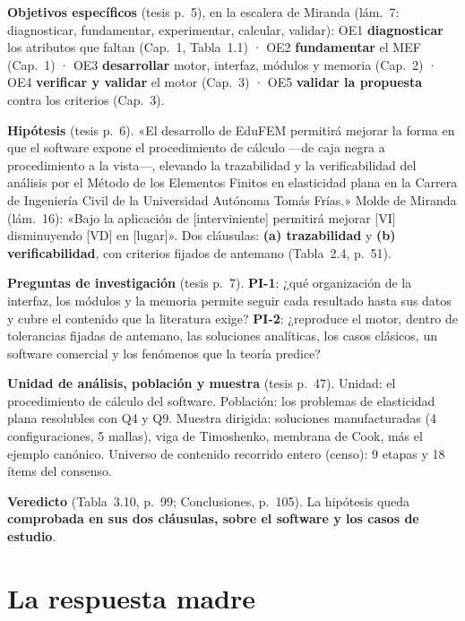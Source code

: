 \documentclass[11pt,a4paper]{article}
\newcommand{\campo}[1]{\textbf{\textcolor{tinta2}{#1}}\enspace}
\begin{document}
\begin{memorizar}
\campo{Objetivos específicos} (tesis p.~5), en la escalera de Miranda (lám.~7: diagnosticar, fundamentar, experimentar, calcular, validar): OE1 \textbf{diagnosticar} los atributos que faltan (Cap.~1, Tabla~1.1) · OE2 \textbf{fundamentar} el MEF (Cap.~1) · OE3 \textbf{desarrollar} motor, interfaz, módulos y memoria (Cap.~2) · OE4 \textbf{verificar y validar} el motor (Cap.~3) · OE5 \textbf{validar la propuesta} contra los criterios (Cap.~3).

\campo{Hipótesis} (tesis p.~6). «El desarrollo de EduFEM permitirá mejorar la forma en que el software expone el procedimiento de cálculo ---de caja negra a procedimiento a la vista---, elevando la trazabilidad y la verificabilidad del análisis por el Método de los Elementos Finitos en elasticidad plana en la Carrera de Ingeniería Civil de la Universidad Autónoma Tomás Frías.» Molde de Miranda (lám.~16): «Bajo la aplicación de [interviniente] permitirá mejorar [VI] disminuyendo [VD] en [lugar]». Dos cláusulas: \textbf{(a) trazabilidad} y \textbf{(b) verificabilidad}, con criterios fijados de antemano (Tabla~2.4, p.~51).

\campo{Preguntas de investigación} (tesis p.~7). \textbf{PI-1}: ¿qué organización de la interfaz, los módulos y la memoria permite seguir cada resultado hasta sus datos y cubre el contenido que la literatura exige? \textbf{PI-2}: ¿reproduce el motor, dentro de tolerancias fijadas de antemano, las soluciones analíticas, los casos clásicos, un software comercial y los fenómenos que la teoría predice?

\campo{Unidad de análisis, población y muestra} (tesis p.~47). Unidad: el procedimiento de cálculo del software. Población: los problemas de elasticidad plana resolubles con Q4 y Q9. Muestra dirigida: soluciones manufacturadas (4 configuraciones, 5 mallas), viga de Timoshenko, membrana de Cook, más el ejemplo canónico. Universo de contenido recorrido entero (censo): 9 etapas y 18 ítems del consenso.

\campo{Veredicto} (Tabla~3.10, p.~99; Conclusiones, p.~105). La hipótesis queda \textbf{comprobada en sus dos cláusulas, sobre el software y los casos de estudio}.
\end{memorizar}

\section{La respuesta madre}\label{sec:madre}
\end{document}
